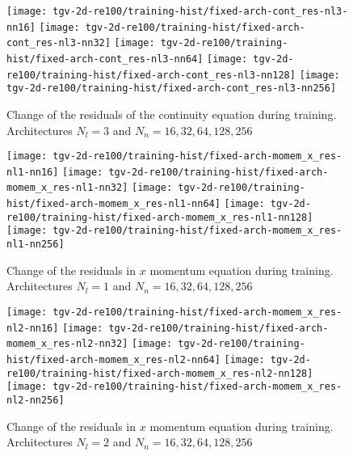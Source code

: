 \begin{figure}[H]
    \centering
        \texttt{[image: tgv-2d-re100/training-hist/fixed-arch-cont\_res-nl3-nn16]}%
    \hfill
        \texttt{[image: tgv-2d-re100/training-hist/fixed-arch-cont\_res-nl3-nn32]}%
    \hfill
        \texttt{[image: tgv-2d-re100/training-hist/fixed-arch-cont\_res-nl3-nn64]}%
    \hfill
        \texttt{[image: tgv-2d-re100/training-hist/fixed-arch-cont\_res-nl3-nn128]}%
    \newline
        \texttt{[image: tgv-2d-re100/training-hist/fixed-arch-cont\_res-nl3-nn256]}%
    \caption{Change of the residuals of the continuity equation during training. Architectures $N_l=3$ and $N_n=16,32,64,128,256$}
\end{figure}

\begin{figure}[H]
    \centering
        \texttt{[image: tgv-2d-re100/training-hist/fixed-arch-momem\_x\_res-nl1-nn16]}%
    \hfill
        \texttt{[image: tgv-2d-re100/training-hist/fixed-arch-momem\_x\_res-nl1-nn32]}%
    \newline
        \texttt{[image: tgv-2d-re100/training-hist/fixed-arch-momem\_x\_res-nl1-nn64]}%
    \hfill
        \texttt{[image: tgv-2d-re100/training-hist/fixed-arch-momem\_x\_res-nl1-nn128]}%
    \newline
        \texttt{[image: tgv-2d-re100/training-hist/fixed-arch-momem\_x\_res-nl1-nn256]}%
    \caption{Change of the residuals in $x$ momentum equation during training. Architectures $N_l=1$ and $N_n=16,32,64,128,256$}
\end{figure}

\begin{figure}[H]
    \centering
        \texttt{[image: tgv-2d-re100/training-hist/fixed-arch-momem\_x\_res-nl2-nn16]}%
    \hfill
        \texttt{[image: tgv-2d-re100/training-hist/fixed-arch-momem\_x\_res-nl2-nn32]}%
    \newline
        \texttt{[image: tgv-2d-re100/training-hist/fixed-arch-momem\_x\_res-nl2-nn64]}%
    \hfill
        \texttt{[image: tgv-2d-re100/training-hist/fixed-arch-momem\_x\_res-nl2-nn128]}%
    \newline
        \texttt{[image: tgv-2d-re100/training-hist/fixed-arch-momem\_x\_res-nl2-nn256]}%
    \caption{Change of the residuals in $x$ momentum equation during training. Architectures $N_l=2$ and $N_n=16,32,64,128,256$}
\end{figure}

